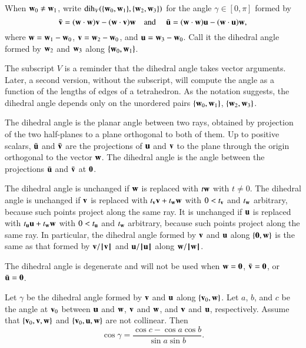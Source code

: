 \begin{definition}\label{def:dih} When ${\mathbf w}_0\ne {\mathbf w}_1$,
  write $\operatorname{dih}_V(\{{\mathbf w}_0,{\mathbf w}_1\},\{{\mathbf w}_2,{\mathbf w}_3\})$ for the angle
  $\gamma\in[0,\pi]$ formed by
\begin{displaymath}
\bar {{\mathbf v}} = ({\mathbf w}\cdot {\mathbf w}) {\mathbf v} - ({\mathbf w}\cdot {\mathbf v}) {\mathbf w}\quad\text{and }\quad \bar {{\mathbf u}} =
({\mathbf w}\cdot {\mathbf w}) {\mathbf u} - ({\mathbf w}\cdot {\mathbf u}) {\mathbf w},
\end{displaymath}
where ${\mathbf w}={\mathbf w}_1-{\mathbf w}_0$, ${\mathbf v} = {\mathbf w}_2-{\mathbf w}_0$,  and ${\mathbf u}={\mathbf w}_3-{\mathbf w}_0$.  Call it
the dihedral angle formed by ${\mathbf w}_2$ and ${\mathbf w}_3$ along $\{{\mathbf w}_0,{\mathbf w}_1\}$.
%
%
\end{definition}
The subscript $V$ is a reminder 
that the dihedral angle takes vector arguments.
Later, a second version, without the subscript, will
compute the angle as a function of the lengths of edges of a 
tetrahedron.
%
%
As the notation suggests, the dihedral angle depends only
on the unordered pairs $\{{\mathbf w}_0,{\mathbf w}_1\}$, $\{{\mathbf w}_2,{\mathbf w}_3\}$.

The dihedral angle is the planar angle between two rays, obtained by
projection of the two half-planes to a plane orthogonal to both of
them.  Up to positive scalars, $\bar {{\mathbf u}}$ and $\bar {{\mathbf v}}$ are the
projections of ${\mathbf u}$ and ${\mathbf v}$ to the plane through the origin
orthogonal to the vector ${\mathbf w}$.  The dihedral angle is the angle
between the projections $\bar {{\mathbf u}}$ and $\bar {{\mathbf v}}$ at ${\mathbf 0}$.

\begin{remark}\label{rem:dih}
  The dihedral angle is unchanged if ${\mathbf w}$ is replaced with $t {\mathbf w}$ with
  $t\ne0$. The dihedral angle is unchanged if ${\mathbf v}$ is replaced with
  $t_{\mathbf v} {\mathbf v} + t_{\mathbf w} {\mathbf w}$ with $0 < t_{\mathbf v}$ and $t_{\mathbf w}$ arbitrary, because
  such points project along the same ray.  It is unchanged if ${\mathbf u}$ is
  replaced with $t_{\mathbf u} {\mathbf u} + t_{\mathbf w} {\mathbf w}$ with $0 < t_{\mathbf u}$ and $t_{\mathbf w}$
  arbitrary, because such points project along the same ray.  In
  particular, the dihedral angle formed by ${\mathbf v}$ and ${\mathbf u}$ along
  $\{{\mathbf 0},{\mathbf w}\}$ is the same as that formed by ${\mathbf v}/{{\hskip0.1em|\hskip-0.15em|\hskip0.1em}{\mathbf v}{\hskip0.1em|\hskip-0.15em|\hskip0.1em}}$ and
  ${\mathbf u}/{{\hskip0.1em|\hskip-0.15em|\hskip0.1em}{\mathbf u}{\hskip0.1em|\hskip-0.15em|\hskip0.1em}}$ along ${\mathbf w}/{{\hskip0.1em|\hskip-0.15em|\hskip0.1em}{\mathbf w}{\hskip0.1em|\hskip-0.15em|\hskip0.1em}}$.
\end{remark}

The dihedral angle is degenerate and will not be used when ${\mathbf w} =
{\mathbf 0}$, $\bar {{\mathbf v}} = {\mathbf 0}$, or $\bar {{\mathbf u}} = {\mathbf 0}$.

\begin{lemma}\label{lemma:sloc}
    Let $\gamma$ be the
  dihedral angle formed by ${\mathbf v}$ and ${\mathbf u}$ along $\{{\mathbf v}_0,{\mathbf w}\}$.  Let
  $a$, $b$, and $c$ be the angle at ${\mathbf v}_0$ between ${\mathbf u}$ and ${\mathbf w}$, ${\mathbf v}$
  and ${\mathbf w}$, and ${\mathbf v}$ and ${\mathbf u}$, respectively. %
  Assume that $\{{\mathbf v}_0,{\mathbf v},{\mathbf w}\}$ and $\{{\mathbf v}_0,{\mathbf u},{\mathbf w}\}$ are not collinear.
  Then
  \begin{displaymath}\cos\gamma = \frac{\cos c - \cos a \cos b}{\sin
      a\sin b}.\end{displaymath}
\end{lemma}
%
%
%

